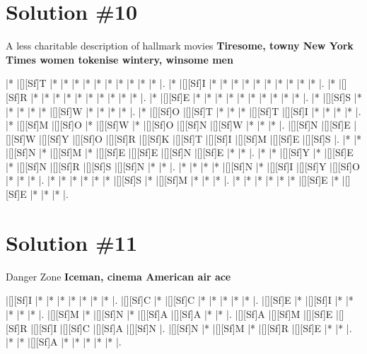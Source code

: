 \documentclass[letterpaper]{article}
\begin{document}
\newpage
\section*{Solution \#10}
A less charitable description of hallmark movies
\newline\textbf{Tiresome, towny New York Times women tokenise wintery, winsome men}

\vspace*{1em}
\begin{Puzzle}{12}{13}
|*        |[][Sf]T  |*        |*        |*        |*        |*        |*        |*        |*        |*        |*        |.
|*        |[][Sf]I  |*        |*        |*        |*        |*        |*        |*        |*        |*        |*        |.
|*        |[][Sf]R  |*        |*        |*        |*        |*        |*        |*        |*        |*        |*        |.
|*        |[][Sf]E  |*        |*        |*        |*        |*        |*        |*        |*        |*        |*        |.
|*        |[][Sf]S  |*        |*        |*        |*        |*        |[][Sf]W  |*        |*        |*        |*        |.
|*        |[][Sf]O  |[][Sf]T  |*        |*        |*        |[][Sf]T  |[][Sf]I  |*        |*        |*        |*        |.
|*        |[][Sf]M  |[][Sf]O  |*        |[][Sf]W  |*        |[][Sf]O  |[][Sf]N  |[][Sf]W   |*        |*        |*        |.
|[][Sf]N  |[][Sf]E  |[][Sf]W  |[][Sf]Y  |[][Sf]O  |[][Sf]R  |[][Sf]K  |[][Sf]T  |[][Sf]I  |[][Sf]M  |[][Sf]E  |[][Sf]S  |.
|*        |*        |[][Sf]N  |*        |[][Sf]M  |*        |[][Sf]E  |[][Sf]E  |[][Sf]N  |[][Sf]E  |*        |*        |.
|*        |*        |[][Sf]Y  |*        |[][Sf]E  |*        |[][Sf]N  |[][Sf]R  |[][Sf]S  |[][Sf]N  |*        |*        |.
|*        |*        |*        |*        |[][Sf]N  |*        |[][Sf]I  |[][Sf]Y  |[][Sf]O  |*        |*        |*        |.
|*        |*        |*        |*        |*        |*        |[][Sf]S  |*        |[][Sf]M  |*        |*        |*        |.
|*        |*        |*        |*        |*        |*        |[][Sf]E  |*        |[][Sf]E  |*        |*        |*        |.
\end{Puzzle}

\newpage
\section*{Solution \#11}
Danger Zone
\newline\textbf{Iceman, cinema American air ace}

\vspace*{1em}
\begin{Puzzle}{8}{7}
|[][Sf]I  |*        |*        |*        |*        |*        |*        |*        |. 
|[][Sf]C  |*        |[][Sf]C  |*        |*        |*        |*        |*        |.  
|[][Sf]E  |*        |[][Sf]I  |*        |*        |*        |*        |*        |.
|[][Sf]M  |*        |[][Sf]N  |*        |[][Sf]A  |[][Sf]A  |*        |*        |.  
|[][Sf]A  |[][Sf]M  |[][Sf]E  |[][Sf]R  |[][Sf]I  |[][Sf]C  |[][Sf]A  |[][Sf]N  |.
|[][Sf]N  |*        |[][Sf]M  |*        |[][Sf]R  |[][Sf]E  |*        |*        |. 
|*        |*        |[][Sf]A  |*        |*        |*        |*        |*        |.
\end{Puzzle}
\end{document}
